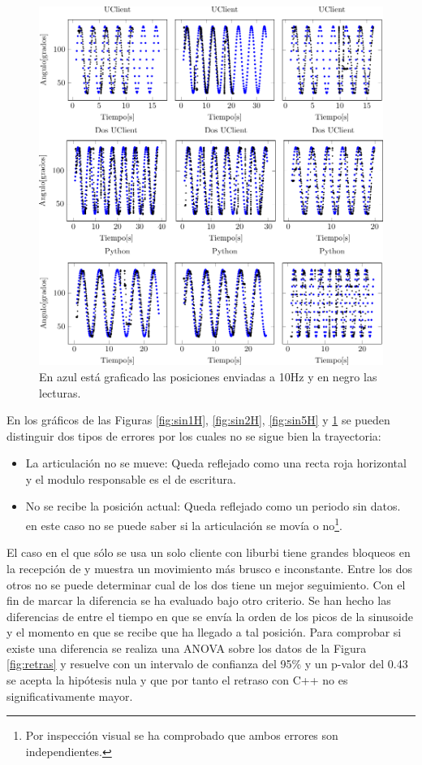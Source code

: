 \documentclass[12pt,a4paper,final,twoside]{book}
\begin{document}
\begin{figure}[H]
	\centering
    \includegraphics[scale=1]{plots/h10.pdf}
	 \caption{En azul está graficado las posiciones enviadas a 10Hz y en negro las lecturas. }
  \label{fig:sin10H}
\end{figure}

En los gráficos de las Figuras \ref{fig:sin1H}, \ref{fig:sin2H}, \ref{fig:sin5H} y \ref{fig:sin10H} se pueden distinguir  dos tipos de errores por los cuales no se sigue bien la trayectoria:

\begin{itemize}
\item La articulación no se mueve: Queda reflejado como una recta roja horizontal y el modulo responsable es el de escritura.
\item No se recibe la posición actual: Queda reflejado como un periodo sin datos. en este caso no se puede saber si la articulación se movía o no\footnote{Por inspección visual se ha comprobado que ambos errores son independientes.}.
\end{itemize}
El caso en el que sólo se usa un solo cliente con liburbi tiene grandes bloqueos en la recepción de y muestra un movimiento más brusco e inconstante.
Entre los dos otros no se puede determinar cual de los dos tiene un mejor seguimiento. Con el fin de marcar la diferencia se ha evaluado bajo otro criterio.
Se han hecho las diferencias de entre el tiempo en que se envía la orden de los picos de la sinusoide y el momento en que se recibe que ha llegado a tal posición. Para comprobar si existe una diferencia se realiza una ANOVA sobre los datos de la Figura \ref{fig:retras} y resuelve con un intervalo de confianza del 95\% y un p-valor del 0.43  se acepta la hipótesis nula y que por tanto el retraso con C++ no es significativamente mayor. 
 
\end{document}
